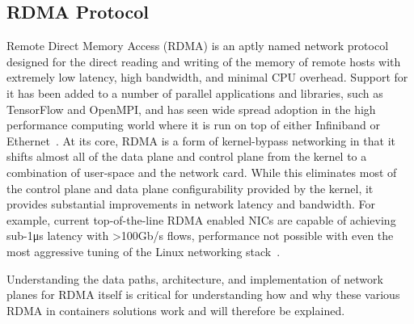 \documentclass[12pt,titlepage]{article}
\begin{document}
\subsection{RDMA Protocol}\label{subsec:RDMA Protocol}
Remote Direct Memory Access (RDMA) is an aptly named network protocol designed for the direct reading and writing of the memory of remote hosts with extremely low latency, high bandwidth, and minimal CPU overhead.
Support for it has been added to a number of parallel applications and libraries, such as TensorFlow and OpenMPI, and has seen wide spread adoption in the high performance computing world where it is run on top of either Infiniband or Ethernet~\cite{kim2019freeflow}.
At its core, RDMA is a form of kernel-bypass networking in that it shifts almost all of the data plane and control plane from the kernel to a combination of user-space and the network card.
While this eliminates most of the control plane and data plane configurability provided by the kernel, it provides substantial improvements in network latency and bandwidth.
For example, current top-of-the-line RDMA enabled NICs are capable of achieving sub-1\si{\micro\second} latency with >100Gb/s flows, performance not possible with even the most aggressive tuning of the Linux networking stack~\cite{mellanoxcx6doc,cloudflarelowlatency,intel800nic}.

Understanding the data paths, architecture, and implementation of network planes for RDMA itself is critical for understanding how and why these various RDMA in containers solutions work and will therefore be explained.

\end{document}

